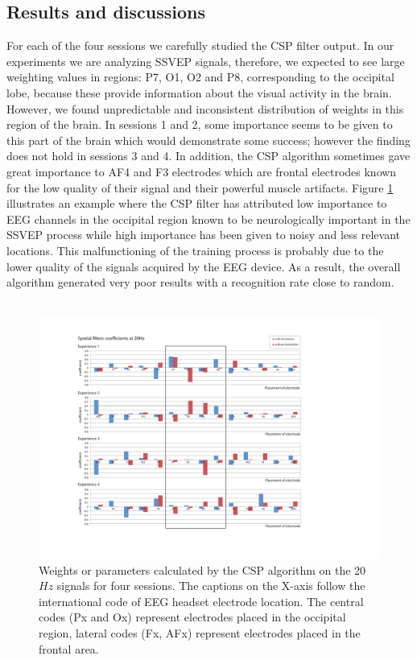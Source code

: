 \documentclass{svmult}
\begin{document}
\subsection{Results and discussions}
For each of the four sessions we carefully studied the CSP filter output. In our experiments we are analyzing SSVEP signals, therefore, we expected to see large weighting values in regions: P7, O1, O2 and P8, corresponding to the occipital lobe, because these provide information about the visual activity in the brain. However, we found unpredictable and inconsistent distribution of weights in this region of the brain. In sessions 1 and 2, some importance seems to be given to this part of the brain which would demonstrate some success; however the finding does not hold in sessions 3 and 4. In addition, the CSP algorithm sometimes gave great importance to AF4 and F3 electrodes which are frontal electrodes known for the low quality of their signal and their powerful muscle artifacts. Figure \ref{fig: CSP_20} illustrates an example where the CSP filter has attributed low importance to EEG channels in the occipital region known to be neurologically important in the SSVEP process while high importance has been given to noisy and less relevant locations. This malfunctioning of the training process is probably due to the lower quality of the signals acquired by the EEG device. As a result, the overall algorithm generated very poor results with a recognition rate close to random.\\
\\
\begin{figure}
\center
\includegraphics[width = \textwidth] {figures/CSP-20Hz-all.pdf}
\caption{Weights or parameters calculated by the CSP algorithm on the 20$Hz$ signals for four sessions. The captions on the X-axis follow the international code of EEG headset electrode location. The central codes (Px and Ox) represent electrodes placed in the occipital region, lateral codes (Fx, AFx) represent electrodes placed in the frontal area.} \label{fig: CSP_20}
\end{figure}
\end{document}

